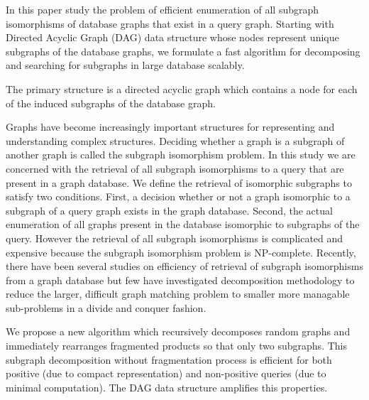 
In this paper study the problem of efficient enumeration of all subgraph isomorphisms of database graphs that exist in a query graph. Starting with Directed Acyclic Graph (DAG) data structure whose nodes represent unique subgraphs of the database graphs, we formulate a fast algorithm for decomposing and searching for subgraphs in large database scalably.


The primary structure is a directed acyclic graph which contains a node for each of the induced subgraphs of the database graph.

Graphs have become increasingly important structures for representing and understanding complex structures. Deciding whether a graph is a subgraph of another graph is called the subgraph isomorphism problem. In this study we are concerned with the retrieval of all subgraph isomorphisms to a query that are present in a graph database.
We define the retrieval of isomorphic subgraphs to satisfy two conditions. First, a decision whether or not a graph isomorphic to a subgraph of a query graph exists in the graph database. Second, the actual enumeration of all graphs present in the database isomorphic to subgraphs of the query. However the retrieval of all subgraph isomorphisms is complicated and expensive because the subgraph isomorphism problem is NP-complete.
Recently, there have been several studies on efficiency of retrieval of subgraph isomorphisms from a graph database but few have investigated decomposition methodology to reduce the larger, difficult graph matching problem to smaller more managable sub-problems in a divide and conquer fashion. 


We propose a new algorithm which recursively decomposes random graphs and immediately rearranges fragmented products so that only two subgraphs. This subgraph decomposition without fragmentation process is efficient for both positive (due to compact representation) and non-positive queries (due to minimal computation). The DAG data structure amplifies this properties.

